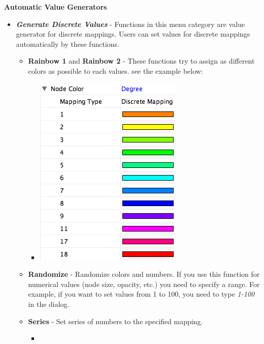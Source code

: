  \textbf{Automatic Value Generators}
\begin{itemize}
\item 

 \emph{\textbf{Generate Discrete Values}
}
 - Functions in this menu category are value generator for discrete mappings. Users can set values for discrete mappings automatically by these functions. 
\begin{itemize}
\item 

 \textbf{Rainbow 1}
 and \textbf{Rainbow 2}
 - These functions try to assign as different colors as possible to each values. see the example below: 
\begin{itemize}
\item 

 \includegraphics[width=.6\textwidth]{images/RainbowExample1.png} 


\end{itemize}

\item 

 \textbf{Randomize}
 - Randomize colors and numbers. If you use this function for numerical values (node size, opacity, etc.) you need to specify a range. For example, if you want to set values from 1 to 100, you need to type \emph{1-100}
 in the dialog. 

\item 

 \textbf{Series}
 - Set series of numbers to the specified mapping. 
\begin{itemize}
\item 


\end{itemize}
\end{itemize}
\end{itemize}
